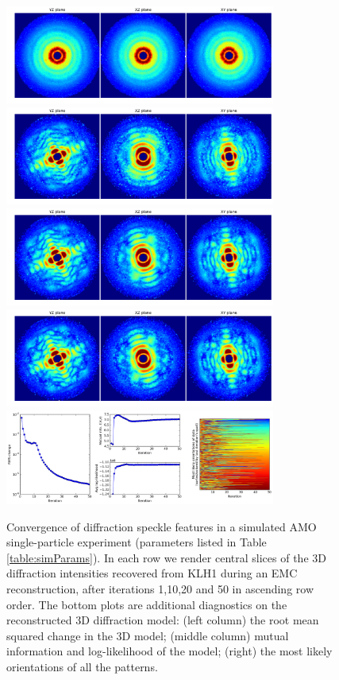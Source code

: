 \documentclass[]{iucr}              %
\begin{document}
\begin{figure}
\caption{Convergence of diffraction speckle features in a simulated AMO single-particle experiment (parameters listed in Table \ref{table:simParams}). In each row we render central slices of the 3D diffraction intensities recovered from KLH1 during an EMC reconstruction, after iterations 1,10,20 and 50 in ascending row order. The bottom plots are additional diagnostics on the reconstructed 3D diffraction model: (left column) the root mean squared change in the 3D model; (middle column) mutual information and log-likelihood of the model; (right) the most likely orientations of all the patterns.}
\includegraphics[width=3.5in]{figures/amo_low_intens_001.png} 
\includegraphics[width=3.5in]{figures/amo_low_intens_010.png}
\includegraphics[width=3.5in]{figures/amo_low_intens_020.png} 
\includegraphics[width=3.5in]{figures/amo_low_intens_050.png} \label{fig:amo_low_intens}
\includegraphics[width=3.5in]{figures/amo_low_log.png} \label{fig:amo_low_log}
\end{figure}
\end{document}
